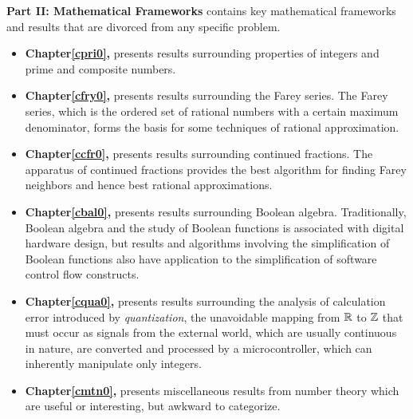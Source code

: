 \documentclass[letterpaper,10pt,titlepage]{custbook}
\begin{document}
\textbf{Part II:  Mathematical Frameworks}
contains key mathematical frameworks and
results that are divorced from any specific problem.
\begin{itemize}
\item \textbf{Chapter\;\ref{cpri0}, \cprizerotitle{}} presents results surrounding
      properties of integers and prime and composite numbers.
\item \textbf{Chapter\;\ref{cfry0}, \cfryzerotitle{}} presents results surrounding
      the Farey series.  The Farey series, which is the 
      ordered set of rational numbers with a certain maximum denominator,
      forms the basis for some techniques of rational approximation.
\item \textbf{Chapter\;\ref{ccfr0}, \ccfrzerotitle{}} presents results surrounding
      continued fractions.  The apparatus of continued
      fractions provides the best algorithm for finding Farey neighbors and hence
      best rational approximations.
\item \textbf{Chapter\;\ref{cbal0}, \cbalzerotitle{}} presents results surrounding
      Boolean algebra.  Traditionally, Boolean algebra and the study of Boolean
      functions is associated with digital hardware design, but results and
      algorithms involving the simplification of Boolean functions also have
      application to the simplification of software control flow constructs.
\item \textbf{Chapter\;\ref{cqua0}, \cquazerotitle{}} presents results surrounding
      the analysis of calculation error introduced by \emph{quantization}, the
      unavoidable mapping from ${\mathbb{R}}{}$ to ${\mathbb{Z}}{}$ that must occur
      as signals from the external world, which are usually continuous in nature,
      are converted and processed by a microcontroller, which can inherently manipulate
      only integers.
\item \textbf{Chapter\;\ref{cmtn0}, \cmtnzerotitle{}} presents miscellaneous results
      from number theory which are useful or interesting, but awkward to
      categorize.
\end{itemize}
\end{document}

